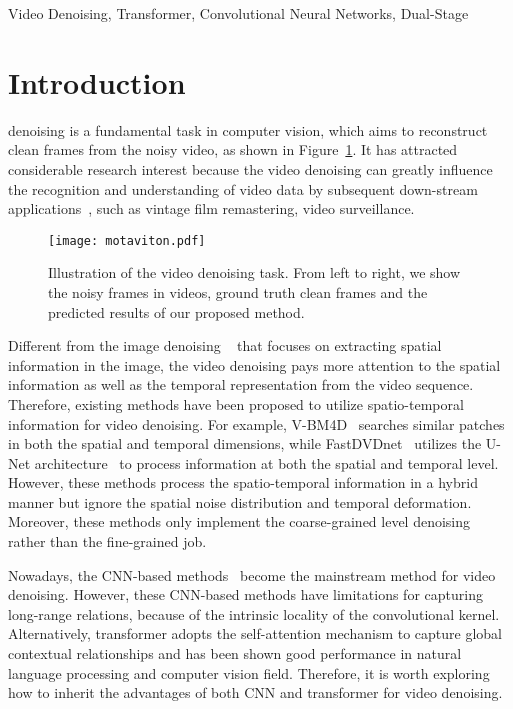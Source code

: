 \documentclass[journal]{IEEEtran}
\begin{document}
\begin{IEEEkeywords}
Video Denoising, Transformer, Convolutional Neural Networks,
Dual-Stage
\end{IEEEkeywords}

\section{Introduction}
 denoising is a fundamental task in computer vision, which aims to reconstruct clean frames from the noisy video, as shown in Figure~\ref{fig:1}.  
It has attracted considerable research interest because the video denoising can greatly influence the recognition and understanding of video data by subsequent down-stream applications~\cite{9351755,Qi_2020_fewshot,qi2020stc,qi2019sports,qi2019stagnet}, such as vintage film remastering, video surveillance.

\begin{figure}[ht]
    \centering
    \vspace{2.5mm}
    \texttt{[image: motaviton.pdf]}
    \vspace{-0.5mm}
    \caption{Illustration of the video denoising task. From left to right, we show the noisy frames in videos, ground truth clean frames and the predicted results of our proposed method.}
    \label{fig:1}
\end{figure}


Different from the image denoising ~\cite{Zhang2017BeyondAG,Cheng2020NBNetNB,dabov2007image} that focuses on extracting spatial information in the image, the video denoising pays more attention to the spatial information as well as the temporal representation from the video sequence. Therefore, existing methods have been proposed to utilize spatio-temporal information for video denoising. For example, V-BM4D~\cite{Maggioni2012VideoDD} searches similar patches in both the spatial and temporal dimensions, while FastDVDnet~\cite{Tassano2020FastDVDnetTR} utilizes the U-Net architecture~\cite{ronneberger2015u} to process information at both the spatial and temporal level. However, these methods process the spatio-temporal information in a hybrid manner but ignore the spatial noise distribution and temporal deformation. Moreover, these methods only implement the coarse-grained level denoising rather than the fine-grained job.


Nowadays, the CNN-based methods~\cite{claus2019videnn,Tassano2019DVDNETAF,Tassano2020FastDVDnetTR,Davy2018NonLocalVD,Wang2020FirstIT,Chen.2016.DRv} become the mainstream method for video denoising.
However, these CNN-based methods have limitations for capturing long-range relations, because of the intrinsic locality of the convolutional kernel. Alternatively, transformer adopts the self-attention mechanism to capture global contextual relationships and has been shown good performance in natural language processing and computer vision field. Therefore, it is worth exploring how to inherit the advantages of both CNN and transformer for video denoising.
\end{document}
